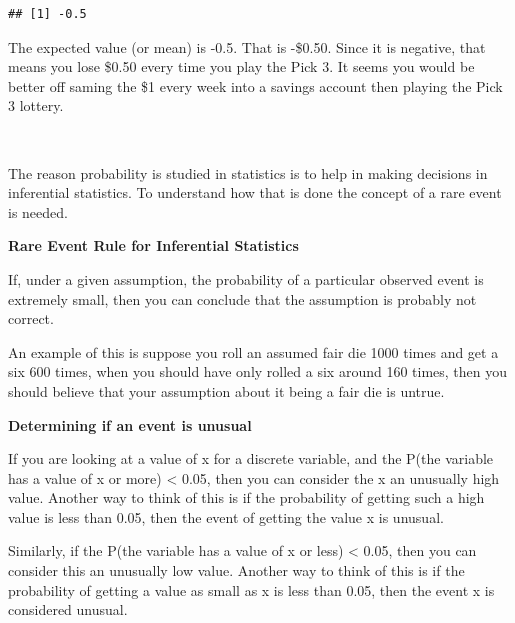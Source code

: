 \documentclass[]{book}
\begin{document}
\begin{verbatim}
## [1] -0.5
\end{verbatim}

The expected value (or mean) is -0.5. That is -\$0.50. Since it is negative, that means you lose \$0.50 every time you play the Pick 3. It seems you would be better off saming the \$1 every week into a savings account then playing the Pick 3 lottery.

\emph{\\
}

The reason probability is studied in statistics is to help in making decisions in inferential statistics. To understand how that is done the concept of a rare event is needed.

\textbf{Rare Event Rule for Inferential Statistics}

If, under a given assumption, the probability of a particular observed event is extremely small, then you can conclude that the assumption is probably not correct.

An example of this is suppose you roll an assumed fair die 1000 times and get a six 600 times, when you should have only rolled a six around 160 times, then you should believe that your assumption about it being a fair die is untrue.

\textbf{Determining if an event is unusual}

If you are looking at a value of x for a discrete variable, and the P(the variable has a value of x or more) \textless{} 0.05, then you can consider the x an unusually high value. Another way to think of this is if the probability of getting such a high value is less than 0.05, then the event of getting the value x is unusual.

Similarly, if the P(the variable has a value of x or less) \textless{} 0.05, then you can consider this an unusually low value. Another way to think of this is if the probability of getting a value as small as x is less than 0.05, then the event x is considered unusual.
\end{document}
